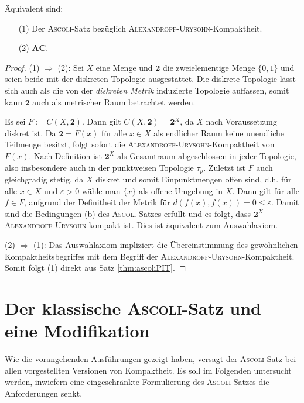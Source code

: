 \begin{thm}
  Äquivalent sind:
  \begin{enumerate}
    \item[(1)] Der \textsc{Ascoli}-Satz bezüglich \textsc{Alexandroff}-\textsc{Urysohn}-Kompaktheit.
    \item[(2)] $\mathbf{AC}$.
  \end{enumerate}
\end{thm}

\begin{proof}
  (1) $\Rightarrow$ (2): Sei $X$ eine Menge und $\mathbf{2}$ die zweielementige Menge $\{0,1\}$ und seien beide mit der diskreten Topologie ausgestattet. 
  Die diskrete Topologie lässt sich auch als die von der \textit{diskreten Metrik} induzierte Topologie auffassen, somit kann $\mathbf{2}$ auch als metrischer Raum betrachtet werden. 

  Es sei $F := C(X, \mathbf{2})$.
  Dann gilt $C(X, \mathbf{2}) = \mathbf{2}^X$, da $X$ nach Voraussetzung diskret ist.
  Da $\mathbf{2} = F(x)$ für alle $x \in X$ als endlicher Raum keine unendliche Teilmenge besitzt, folgt sofort die \textsc{Alexandroff}-\textsc{Urysohn}-Kompaktheit von $F(x)$.
  Nach Definition ist $\mathbf{2}^X$ als Gesamtraum abgeschlossen in jeder Topologie, also insbesondere auch in der punktweisen Topologie $\tau_p$.
  Zuletzt ist $F$ auch gleichgradig stetig, da $X$ diskret und somit Einpunktmengen offen sind, d.h. für alle $x \in X$ und $\varepsilon > 0$ wähle man $\{x\}$ als offene Umgebung in $X$. Dann gilt für alle $f \in F$, aufgrund der Definitheit der Metrik für  $d(f(x),f(x)) = 0 \leq \varepsilon$.
  Damit sind die Bedingungen (b) des \textsc{Ascoli}-Satzes erfüllt und es folgt, dass $\mathbf{2}^X$ \textsc{Alexandroff}-\textsc{Urysohn}-kompakt ist. Dies ist äquivalent zum Auswahlaxiom.

  (2) $\Rightarrow$ (1): Das Auswahlaxiom impliziert die Übereinstimmung des gewöhnlichen Kompaktheitsbegriffes mit dem Begriff der \textsc{Alexandroff}-\textsc{Urysohn}-Kompaktheit. Somit folgt (1) direkt aus Satz \ref{thm:ascoliPIT}.
\end{proof}

\section{Der klassische \textsc{Ascoli}-Satz und eine Modifikation}

Wie die vorangehenden Ausführungen gezeigt haben, versagt der \textsc{Ascoli}-Satz bei allen vorgestellten Versionen von Kompaktheit. Es soll im Folgenden untersucht werden, inwiefern eine eingeschränkte Formulierung des \textsc{Ascoli}-Satzes die Anforderungen senkt.

